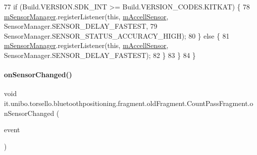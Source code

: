 \begin{DoxyCode}
77             \textcolor{keywordflow}{if} (Build.VERSION.SDK\_INT >= Build.VERSION\_CODES.KITKAT) \{
78                 \hyperlink{classit_1_1unibo_1_1torsello_1_1bluetoothpositioning_1_1fragment_1_1oldFragment_1_1CountPassFragment_a24e4aafb3d377f25aa09024e196d4d8d_a24e4aafb3d377f25aa09024e196d4d8d}{mSensorManager}.registerListener(\textcolor{keyword}{this}, 
      \hyperlink{classit_1_1unibo_1_1torsello_1_1bluetoothpositioning_1_1fragment_1_1oldFragment_1_1CountPassFragment_a5ceea3320c4813a465731b5f8cd36ce2_a5ceea3320c4813a465731b5f8cd36ce2}{mAccellSensor}, SensorManager.SENSOR\_DELAY\_FASTEST,
79                         SensorManager.SENSOR\_STATUS\_ACCURACY\_HIGH);
80             \} \textcolor{keywordflow}{else} \{
81                 \hyperlink{classit_1_1unibo_1_1torsello_1_1bluetoothpositioning_1_1fragment_1_1oldFragment_1_1CountPassFragment_a24e4aafb3d377f25aa09024e196d4d8d_a24e4aafb3d377f25aa09024e196d4d8d}{mSensorManager}.registerListener(\textcolor{keyword}{this}, 
      \hyperlink{classit_1_1unibo_1_1torsello_1_1bluetoothpositioning_1_1fragment_1_1oldFragment_1_1CountPassFragment_a5ceea3320c4813a465731b5f8cd36ce2_a5ceea3320c4813a465731b5f8cd36ce2}{mAccellSensor}, SensorManager.SENSOR\_DELAY\_FASTEST);
82             \}
83         \}
84     \}
\end{DoxyCode}
\hypertarget{classit_1_1unibo_1_1torsello_1_1bluetoothpositioning_1_1fragment_1_1oldFragment_1_1CountPassFragment_a278dd4ec68b222361517aed048efea68_a278dd4ec68b222361517aed048efea68}{}\label{classit_1_1unibo_1_1torsello_1_1bluetoothpositioning_1_1fragment_1_1oldFragment_1_1CountPassFragment_a278dd4ec68b222361517aed048efea68_a278dd4ec68b222361517aed048efea68} 
\paragraph{\texorpdfstring{on\+Sensor\+Changed()}{onSensorChanged()}}
{\footnotesize\ttfamily void it.\+unibo.\+torsello.\+bluetoothpositioning.\+fragment.\+old\+Fragment.\+Count\+Pass\+Fragment.\+on\+Sensor\+Changed (\begin{DoxyParamCaption}\item[{Sensor\+Event}]{event }\end{DoxyParamCaption})}


